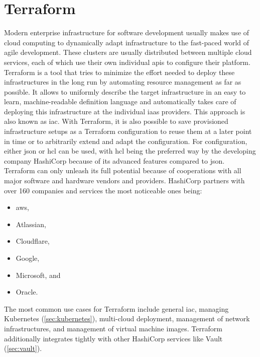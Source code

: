 \section{Terraform}
Modern enterprise infrastructure for software development usually makes use of cloud computing to dynamically adapt infrastructure to the fast-paced world of agile development.
These clusters are usually distributed between multiple cloud services, each of which use their own individual \acp{api} to configure their platform.
Terraform is a tool that tries to minimize the effort needed to deploy these infrastructures in the long run by automating resource management as far as possible.
It allows to uniformly describe the target infrastructure in an easy to learn, machine-readable definition language and automatically takes care of deploying this infrastructure at the individual \ac{iaas} providers.
This approach is also known as \ac{iac}.
With Terraform, it is also possible to save provisioned infrastructure setups as a Terraform configuration to reuse them at a later point in time or to arbitrarily extend and adapt the configuration.
For configuration, either \ac{json} or \ac{hcl} can be used, with \ac{hcl} being the preferred way by the developing company HashiCorp because of its advanced features compared to \ac{json}.
Terraform can only unleash its full potential because of cooperations with all major software and hardware vendors and providers.
HashiCorp partners with over 160 companies and services the most noticeable ones being:
\begin{itemize}
    \item \ac{aws},
    \item Atlassian,
    \item Cloudflare,
    \item Google,
    \item Microsoft, and
    \item Oracle.
\end{itemize}

The most common use cases for Terraform include general \ac{iac}, managing Kubernetes (\autoref{sec:kubernetes}), multi-cloud deployment, management of network infrastructures, and management of virtual machine images.
Terraform additionally integrates tightly with other HashiCorp services like Vault (\autoref{sec:vault}).

    
